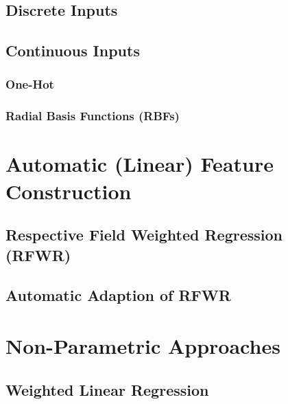 		\subsection{Discrete Inputs} %

		\subsection{Continuous Inputs} %

			\subsubsection{One-Hot} %

			\subsubsection{Radial Basis Functions (RBFs)} %

	\section{Automatic (Linear) Feature Construction} %

		\subsection{Respective Field Weighted Regression (RFWR)} %

		\subsection{Automatic Adaption of RFWR} %

	\section{Non-Parametric Approaches} %

		\subsection{Weighted Linear Regression} %

